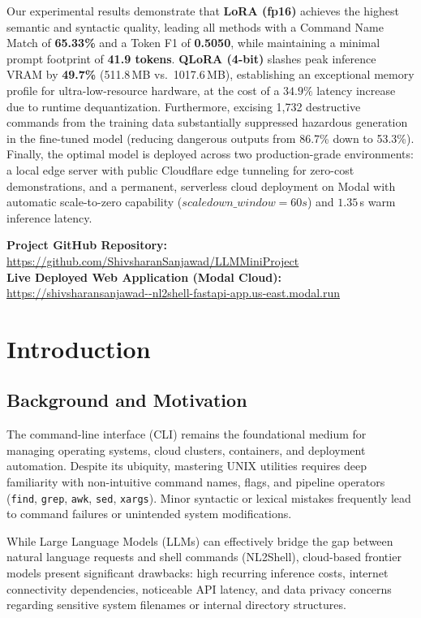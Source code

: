 \documentclass[11pt,a4paper]{report}
\begin{document}
Our experimental results demonstrate that \textbf{LoRA (fp16)} achieves the highest semantic and syntactic quality, leading all methods with a Command Name Match of \textbf{65.33\%} and a Token F1 of \textbf{0.5050}, while maintaining a minimal prompt footprint of \textbf{41.9 tokens}. \textbf{QLoRA (4-bit)} slashes peak inference VRAM by \textbf{49.7\%} (511.8\,MB vs.\ 1017.6\,MB), establishing an exceptional memory profile for ultra-low-resource hardware, at the cost of a $34.9\%$ latency increase due to runtime dequantization. Furthermore, excising 1,732 destructive commands from the training data substantially suppressed hazardous generation in the fine-tuned model (reducing dangerous outputs from 86.7\% down to 53.3\%). Finally, the optimal model is deployed across two production-grade environments: a local edge server with public Cloudflare edge tunneling for zero-cost demonstrations, and a permanent, serverless cloud deployment on Modal with automatic scale-to-zero capability ($scaledown\_window=60s$) and $1.35$\,s warm inference latency.

\vspace{0.8cm}
\noindent \textbf{Project GitHub Repository:} \url{https://github.com/ShivsharanSanjawad/LLMMiniProject}\\[0.2cm]
\noindent \textbf{Live Deployed Web Application (Modal Cloud):} \url{https://shivsharansanjawad--nl2shell-fastapi-app.us-east.modal.run}

\chapter{Introduction}

\section{Background and Motivation}
The command-line interface (CLI) remains the foundational medium for managing operating systems, cloud clusters, containers, and deployment automation. Despite its ubiquity, mastering UNIX utilities requires deep familiarity with non-intuitive command names, flags, and pipeline operators (\texttt{find}, \texttt{grep}, \texttt{awk}, \texttt{sed}, \texttt{xargs}). Minor syntactic or lexical mistakes frequently lead to command failures or unintended system modifications.

While Large Language Models (LLMs) can effectively bridge the gap between natural language requests and shell commands (NL2Shell), cloud-based frontier models present significant drawbacks: high recurring inference costs, internet connectivity dependencies, noticeable API latency, and data privacy concerns regarding sensitive system filenames or internal directory structures.
\end{document}
